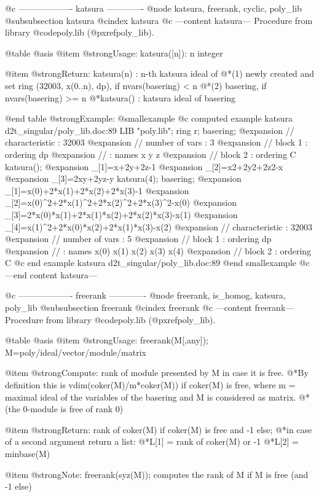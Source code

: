 @c ------------------- katsura -------------
@node katsura, freerank, cyclic, poly_lib
@subsubsection katsura
@cindex katsura
@c ---content katsura---
Procedure from library @code{poly.lib} (@pxref{poly_lib}).

@table @asis
@item @strong{Usage:}
katsura([n]): n integer

@item @strong{Return:}
katsura(n) : n-th katsura ideal of
@*(1) newly created and set ring (32003, x(0..n), dp), if
nvars(basering) < n
@*(2) basering, if nvars(basering) >= n
@*katsura() : katsura ideal of basering

@end table
@strong{Example:}
@smallexample
@c computed example katsura d2t_singular/poly_lib.doc:89 
LIB "poly.lib";
ring r; basering;
@expansion{} //   characteristic : 32003
@expansion{} //   number of vars : 3
@expansion{} //        block   1 : ordering dp
@expansion{} //                  : names    x y z 
@expansion{} //        block   2 : ordering C
katsura();
@expansion{} _[1]=x+2y+2z-1
@expansion{} _[2]=x2+2y2+2z2-x
@expansion{} _[3]=2xy+2yz-y
katsura(4); basering;
@expansion{} _[1]=x(0)+2*x(1)+2*x(2)+2*x(3)-1
@expansion{} _[2]=x(0)^2+2*x(1)^2+2*x(2)^2+2*x(3)^2-x(0)
@expansion{} _[3]=2*x(0)*x(1)+2*x(1)*x(2)+2*x(2)*x(3)-x(1)
@expansion{} _[4]=x(1)^2+2*x(0)*x(2)+2*x(1)*x(3)-x(2)
@expansion{} //   characteristic : 32003
@expansion{} //   number of vars : 5
@expansion{} //        block   1 : ordering dp
@expansion{} //                  : names    x(0) x(1) x(2) x(3) x(4) 
@expansion{} //        block   2 : ordering C
@c end example katsura d2t_singular/poly_lib.doc:89
@end smallexample
@c ---end content katsura---

@c ------------------- freerank -------------
@node freerank, is_homog, katsura, poly_lib
@subsubsection freerank
@cindex freerank
@c ---content freerank---
Procedure from library @code{poly.lib} (@pxref{poly_lib}).

@table @asis
@item @strong{Usage:}
freerank(M[,any]); M=poly/ideal/vector/module/matrix

@item @strong{Compute:}
rank of module presented by M in case it is free.
@*By definition this is vdim(coker(M)/m*coker(M)) if coker(M)
is free, where m = maximal ideal of the variables of the
basering and M is considered as matrix.
@*(the 0-module is free of rank 0)

@item @strong{Return:}
rank of coker(M) if coker(M) is free and -1 else;
@*in case of a second argument return a list:
@*L[1] = rank of coker(M) or -1
@*L[2] = minbase(M)

@item @strong{Note:}
freerank(syz(M)); computes the rank of M if M is free (and -1 else)

